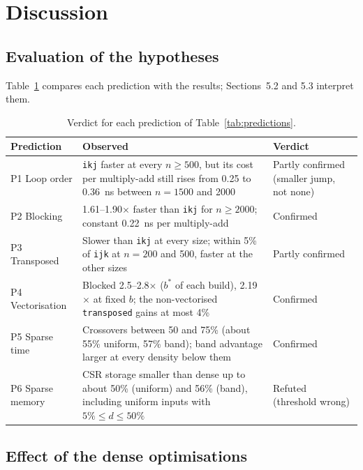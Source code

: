 \documentclass[11pt,a4paper]{article}
\begin{document}
\needspace{0.45\textheight}
\section{Discussion}

\subsection{Evaluation of the hypotheses}

Table~\ref{tab:verdicts} compares each prediction with the results; Sections~5.2 and 5.3
interpret them.

\begin{table}[H]
\centering
\small
\setlength{\tabcolsep}{4pt}
\begin{tabular}{>{\raggedright\arraybackslash}p{2.7cm}p{9.1cm}>{\raggedright\arraybackslash}p{3.3cm}}
\toprule
\textbf{Prediction} & \textbf{Observed} & \textbf{Verdict} \\
\midrule
P1 Loop order & \texttt{ikj} faster at every $n \ge 500$, but its cost per multiply-add
still rises from 0.25 to 0.36~ns between $n = 1500$ and 2000 & Partly confirmed (smaller
jump, not none) \\
P2 Blocking & 1.61--1.90$\times$ faster than \texttt{ikj} for $n \ge 2000$; constant
0.22~ns per multiply-add & Confirmed \\
P3 Transposed & Slower than \texttt{ikj} at every size; within 5\% of \texttt{ijk} at
$n = 200$ and 500, faster at the other sizes & Partly confirmed \\
P4 Vectorisation & Blocked 2.5--2.8$\times$ ($b^*$ of each build), 2.19$\times$ at fixed $b$;
the non-vectorised \texttt{transposed} gains at most 4\% & Confirmed \\
P5 Sparse time & Crossovers between 50 and 75\% (about 55\% uniform, 57\% band); band
advantage larger at every density below them & Confirmed \\
P6 Sparse memory & CSR storage smaller than dense up to about 50\% (uniform) and 56\%
(band), including uniform inputs with $5\% \le d \le 50\%$ & Refuted (threshold wrong) \\
\bottomrule
\end{tabular}
\caption{Verdict for each prediction of Table~\ref{tab:predictions}.}
\label{tab:verdicts}
\end{table}

\subsection{Effect of the dense optimisations}
\end{document}
